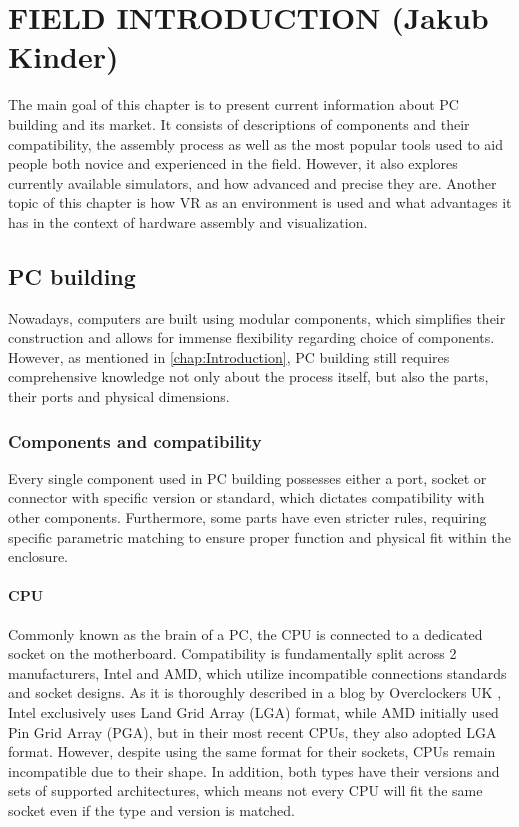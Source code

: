 \chapter{FIELD INTRODUCTION (Jakub Kinder)}
\label{chap:FieldIntroduction}

The main goal of this chapter is to present current information about PC building and its market.
It consists of descriptions of components and their compatibility, the assembly process as well as the most popular tools used to aid people both novice and experienced in the field.
However, it also explores currently available simulators, and how advanced and precise they are.
Another topic of this chapter is how VR as an environment is used and what advantages it has in the context of hardware assembly and visualization.

\section{PC building}
Nowadays, computers are built using modular components, which simplifies their construction and allows for immense flexibility regarding choice of components.
However, as mentioned in \autoref{chap:Introduction}, PC building still requires comprehensive knowledge not only about the process itself, but also the parts, their ports and physical dimensions.

\subsection{Components and compatibility}
Every single component used in PC building possesses either a port, socket or connector with specific version or standard, which dictates compatibility with other components.
Furthermore, some parts have even stricter rules, requiring specific parametric matching to ensure proper function and physical fit within the enclosure.

\subsubsection{CPU}
Commonly known as the brain of a PC, the CPU is connected to a dedicated socket on the motherboard.
Compatibility is fundamentally split across 2 manufacturers, Intel and AMD, which utilize incompatible connections standards and socket designs.
As it is thoroughly described in a blog by Overclockers UK \cite{haylock_sockets_2025}, Intel exclusively uses Land Grid Array (LGA) format, while AMD initially used Pin Grid Array (PGA), but in their most recent CPUs, they also adopted LGA format.
However, despite using the same format for their sockets, CPUs remain incompatible due to their shape.
In addition, both types have their versions and sets of supported architectures, which means not every CPU will fit the same socket even if the type and version is matched.

